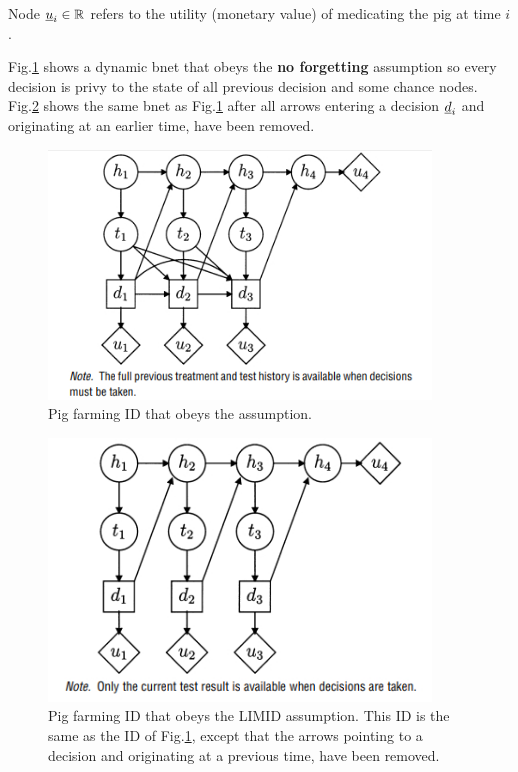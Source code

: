 \begin{itemize}
Node $\rvu_i\in \RR$ refers to the utility (monetary value)  
of medicating the pig at time $i$.

 
Fig.\ref{fig-pre-limid} shows a dynamic bnet that
obeys the {\bf no forgetting} assumption so every decision is
privy to the state of all previous decision and some chance nodes.
Fig.\ref{fig-post-limid} shows the same bnet as 
Fig.\ref{fig-pre-limid} after all arrows entering a decision $\rvd_i$ and originating at an earlier time, have been removed.



\begin{figure}[h!]
\centering
\includegraphics[width=4in]
{influ-diag/pre-limid.jpg}
\caption{Pig farming ID that obeys the 
assumption.  
}
\label{fig-pre-limid}
\end{figure}


\begin{figure}[h!]
\centering
\includegraphics[width=4in]
{influ-diag/post-limid.jpg}
\caption{Pig farming ID that obeys the  LIMID
assumption. This ID is the same as the ID of Fig.\ref{fig-pre-limid},
except that the arrows pointing to a decision and originating at a previous time, have been removed.}
\label{fig-post-limid}
\end{figure}


\end{itemize}
